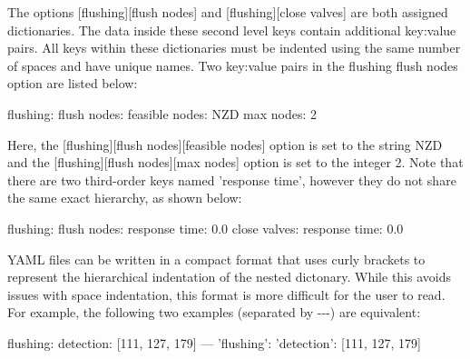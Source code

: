 \begin{itemize}
The options [flushing][flush nodes] and [flushing][close valves] are both assigned dictionaries. 
The data inside these second level keys contain additional key:value pairs. 
All keys within these dictionaries must be indented using the same number of spaces and have unique names. 
Two key:value pairs in the flushing flush nodes option are listed below:
\begin{unknownListing}
flushing:
  flush nodes:
    feasible nodes: NZD
    max nodes: 2
\end{unknownListing}    
Here, the [flushing][flush nodes][feasible nodes] option is set to the string NZD 
and the [flushing][flush nodes][max nodes] option is set to the integer 2. 
Note that there are two third-order keys named 'response time', however they do not share the same exact hierarchy, as shown below:
\begin{unknownListing}
flushing:
  flush nodes:
    response time: 0.0
  close valves:
    response time: 0.0    
\end{unknownListing}    

YAML files can be written in a compact format that uses curly brackets to represent the hierarchical indentation of the nested dictonary. 
While this avoids issues with space indentation, this format is more difficult for the user to read. 
For example, the following two examples (separated by -\--\--) are equivalent: 
\begin{unknownListing} 
flushing:
  detection: [111, 127, 179] 
---
{'flushing': {'detection': [111, 127, 179]}}
\end{unknownListing}  
\end{itemize}

